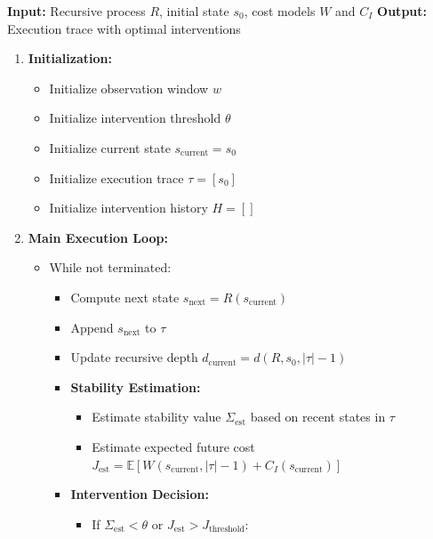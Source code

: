 \documentclass[
]{article}
\providecommand{\tightlist}{%
  \setlength{\itemsep}{0pt}\setlength{\parskip}{0pt}}
\begin{document}
\textbf{Input:} Recursive process \(R\), initial state \(s_0\), cost
models \(W\) and \(C_I\) \textbf{Output:} Execution trace with optimal
interventions

\begin{enumerate}
\def\labelenumi{\arabic{enumi}.}
\tightlist
\item
  \textbf{Initialization:}

  \begin{itemize}
  \tightlist
  \item
    Initialize observation window \(w\)
  \item
    Initialize intervention threshold \(\theta\)
  \item
    Initialize current state \(s_{\text{current}} = s_0\)
  \item
    Initialize execution trace \(\tau = [s_0]\)
  \item
    Initialize intervention history \(H = []\)
  \end{itemize}
\item
  \textbf{Main Execution Loop:}

  \begin{itemize}
  \tightlist
  \item
    While not terminated:

    \begin{itemize}
    \item
      Compute next state \(s_{\text{next}} = R(s_{\text{current}})\)
    \item
      Append \(s_{\text{next}}\) to \(\tau\)
    \item
      Update recursive depth
      \(d_{\text{current}} = d(R, s_0, |\tau|-1)\)
    \item
      \textbf{Stability Estimation:}

      \begin{itemize}
      \tightlist
      \item
        Estimate stability value \(\Sigma_{\text{est}}\) based on recent
        states in \(\tau\)
      \item
        Estimate expected future cost
        \(J_{\text{est}} = \mathbb{E}[W(s_{\text{current}}, |\tau|-1) + C_I(s_{\text{current}})]\)
      \end{itemize}
    \item
      \textbf{Intervention Decision:}

      \begin{itemize}
      \tightlist
      \item
        If \(\Sigma_{\text{est}} < \theta\) or
        \(J_{\text{est}} > J_{\text{threshold}}\):


\end{itemize}
\end{itemize}
\end{itemize}
\end{enumerate}
\end{document}
